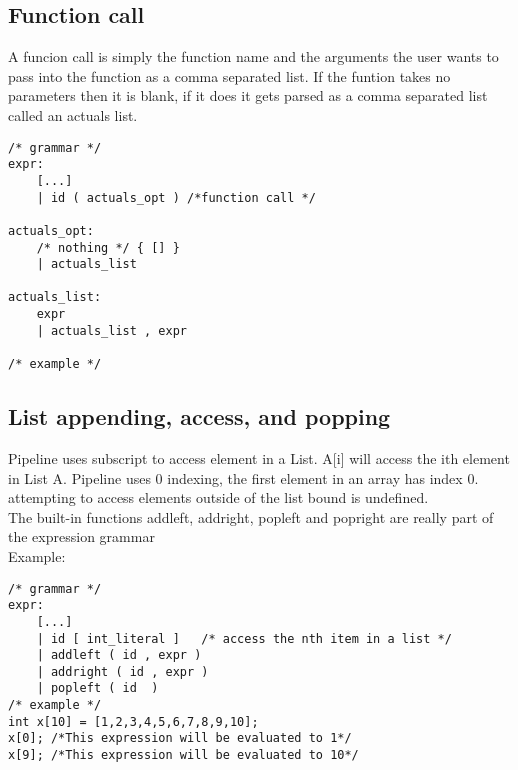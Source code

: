 \documentclass[./LRM_main.tex]{subfiles}
\begin{document}
\subsection{Function call}
A funcion call is simply the function name and the arguments the user wants to pass into the function as a comma separated list. If the funtion takes no parameters then it is blank, if it does it gets parsed as a comma separated list called an actuals list.
\begin{lstlisting}
/* grammar */
expr:
	[...]
    | id ( actuals_opt ) /*function call */
    
actuals_opt:
    /* nothing */ { [] }
    | actuals_list

actuals_list:
    expr
    | actuals_list , expr

/* example */

\end{lstlisting}
\subsection{List appending, access, and popping}
Pipeline uses subscript to access element in a List. A[i] will access the ith element in List A. Pipeline uses 0 indexing, the first element in an array has index 0.\\
attempting to access elements outside of the list bound is undefined.\\
The built-in functions addleft, addright, popleft and popright  are really part of the expression grammar
\pagebreak\\
Example:
\begin{lstlisting}
/* grammar */
expr:
	[...]
    | id [ int_literal ]   /* access the nth item in a list */ 
    | addleft ( id , expr )  
    | addright ( id , expr ) 
    | popleft ( id  ) 
/* example */
int x[10] = [1,2,3,4,5,6,7,8,9,10];
x[0]; /*This expression will be evaluated to 1*/
x[9]; /*This expression will be evaluated to 10*/
\end{lstlisting}
\end{document}
